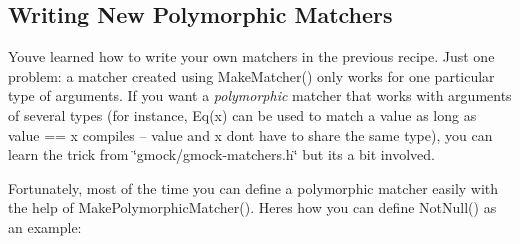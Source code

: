 \subsection*{Writing New Polymorphic Matchers}

You\textquotesingle{}ve learned how to write your own matchers in the previous recipe. Just one problem\+: a matcher created using {\ttfamily Make\+Matcher()} only works for one particular type of arguments. If you want a {\itshape polymorphic} matcher that works with arguments of several types (for instance, {\ttfamily Eq(x)} can be used to match a {\ttfamily value} as long as {\ttfamily value} == {\ttfamily x} compiles -- {\ttfamily value} and {\ttfamily x} don\textquotesingle{}t have to share the same type), you can learn the trick from {\ttfamily \char`\"{}gmock/gmock-\/matchers.\+h\char`\"{}} but it\textquotesingle{}s a bit involved.

Fortunately, most of the time you can define a polymorphic matcher easily with the help of {\ttfamily Make\+Polymorphic\+Matcher()}. Here\textquotesingle{}s how you can define {\ttfamily Not\+Null()} as an example\+:


